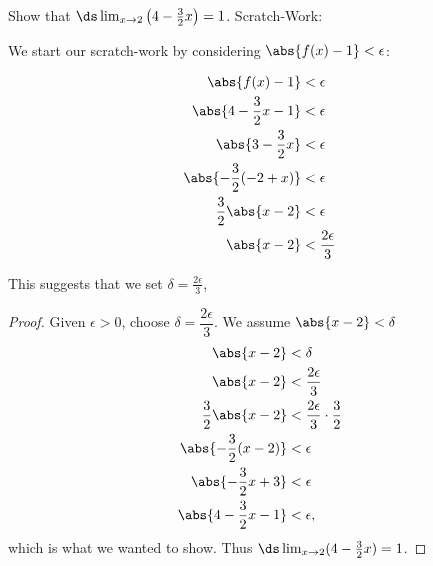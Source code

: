 \begin{example}\label{ex_compute_limNew8}
Show that $\ds \lim_{x\to 2}\left(4-\frac{3}{2}x\right)=1$.
\solution
Scratch-Work:
 
We start our scratch-work by considering $\abs{f(x)-1}<\epsilon$:

\allowdisplaybreaks
\begin{align*}
\abs{f(x)-1}&<\epsilon \\
\abs{4-\frac{3}{2}x-1}&<\epsilon \\
\abs{3-\frac{3}{2}x}&<\epsilon\\
\abs{-\frac{3}{2}(-2+x)}&<\epsilon \\
\frac{3}{2}\abs{x-2}&<\epsilon \\
\abs{x-2}&<\frac{2\epsilon}{3}
\end{align*}

This suggests that we set $\delta=\frac{2\epsilon}{3}$,

\begin{proof}
Given $\epsilon>0$, choose $\delta=\dfrac{2\epsilon}{3}$. We assume $\abs{x-2}<\delta$
%
\begin{align*}
\abs{x - 2} &< \delta \\
\abs{x - 2} &< \frac{2\epsilon}{3}\\
\frac{3}{2}\abs{x - 2} &< \frac{2\epsilon}{3}\cdot \frac{3}{2}\\
\abs{-\frac{3}{2}(x-2)}&< \epsilon \\
\abs{-\frac{3}{2}x+3}&< \epsilon  \\
\abs{4-\frac{3}{2}x-1}&< \epsilon,
\end{align*}
%
which is what we wanted to show. Thus  $\ds \lim_{x\to 2}(4-\frac32 x)=1$.\qedhere
\end{proof}
\end{example}

